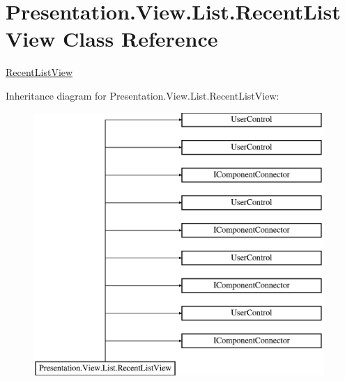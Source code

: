 \hypertarget{class_presentation_1_1_view_1_1_list_1_1_recent_list_view}{}\section{Presentation.\+View.\+List.\+Recent\+List\+View Class Reference}
\label{class_presentation_1_1_view_1_1_list_1_1_recent_list_view}


\hyperlink{class_presentation_1_1_view_1_1_list_1_1_recent_list_view}{Recent\+List\+View}  


Inheritance diagram for Presentation.\+View.\+List.\+Recent\+List\+View\+:\begin{figure}[H]
\begin{center}
\leavevmode
\includegraphics[height=10.000000cm]{class_presentation_1_1_view_1_1_list_1_1_recent_list_view}
\end{center}
\end{figure}

